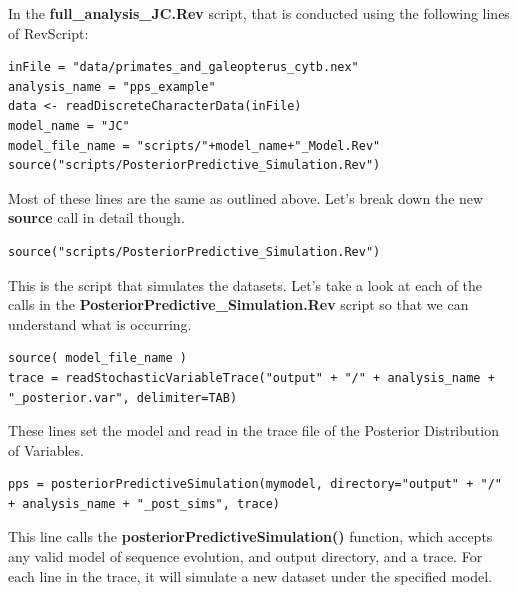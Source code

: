In the \textbf{full\_analysis\_JC.Rev} script, that is conducted using the following lines of RevScript: 
{\tt \begin{snugshade*}
\begin{lstlisting}
inFile = "data/primates_and_galeopterus_cytb.nex"
analysis_name = "pps_example"
data <- readDiscreteCharacterData(inFile)
model_name = "JC"
model_file_name = "scripts/"+model_name+"_Model.Rev"
source("scripts/PosteriorPredictive_Simulation.Rev")
\end{lstlisting}
\end{snugshade*}}

Most of these lines are the same as outlined above. Let's break down the new \textbf{source} call in detail though.  

{\tt \begin{snugshade*}
\begin{lstlisting}
source("scripts/PosteriorPredictive_Simulation.Rev")
\end{lstlisting}
\end{snugshade*}}
This is the script that simulates the datasets. Let's take a look at each of the calls in the \textbf{PosteriorPredictive\_Simulation.Rev} script so 
that we can understand what is occurring. 

{\tt \begin{snugshade*}
\begin{lstlisting}
source( model_file_name )
trace = readStochasticVariableTrace("output" + "/" + analysis_name + "_posterior.var", delimiter=TAB)
\end{lstlisting}
\end{snugshade*}}
These lines set the model and read in the trace file of the Posterior Distribution of Variables.

{\tt \begin{snugshade*}
\begin{lstlisting}
pps = posteriorPredictiveSimulation(mymodel, directory="output" + "/" + analysis_name + "_post_sims", trace)
\end{lstlisting}
\end{snugshade*}}
This line calls the \textbf{posteriorPredictiveSimulation()} function, which accepts any valid model of sequence evolution, and output directory, and a trace. For each line in the trace, it will simulate a new dataset under the specified model.

